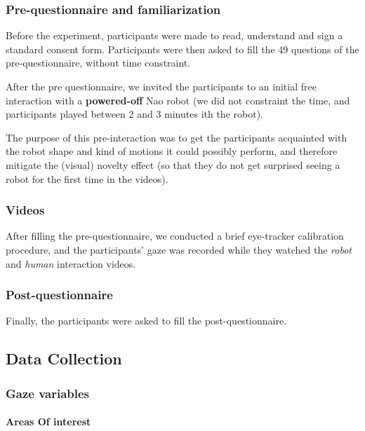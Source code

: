 \documentclass[lettersize, noapacite, twoside, HRI]{apa_HRI}
\begin{document}
\subsubsection{Pre-questionnaire and familiarization}

Before the experiment, participants were made to read, understand and sign a
standard consent form. Participants were then asked to fill the 49 questions of
the pre-questionnaire, without time constraint.

After the pre questionnaire, we invited the participants to an initial
free interaction with a \textbf{powered-off} Nao robot (we did not constraint
the time, and participants played between 2 and 3 minutes ith the robot).

The purpose of this pre-interaction was to get the participants acquainted with the
robot shape and kind of motions it could possibly perform, and therefore
mitigate the (visual) novelty effect (so that they do not get surprised seeing
a robot for the first time in the videos).

\subsubsection{Videos}

After filling the pre-questionnaire, we conducted a brief eye-tracker
calibration procedure, and the participants' gaze was recorded while they
watched the \emph{robot} and \emph{human} interaction videos.

\subsubsection{Post-questionnaire}

Finally, the participants were asked to fill the post-questionnaire.

\subsection{Data Collection}

\subsubsection{Gaze variables}

\paragraph{Areas Of interest}
\end{document}
